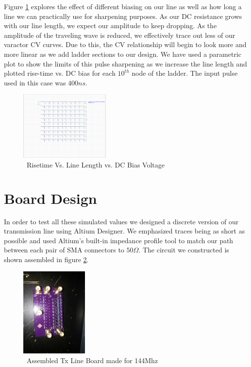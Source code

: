 \documentclass[journal]{IEEEtran} \usepackage[english]{babel}
\begin{document}
 
 Figure \ref{fig:RiseVsLineVsBias} explores the effect of different biasing on
 our line as well as how long a line we can practically use for sharpening
 purposes. As our DC resistance grows with our line length, we expect our
 amplitude to keep dropping. As the amplitude of the traveling wave is reduced,
 we effectively trace out less of our varactor CV curves. Due to this, the CV
 relationship will begin to look more and more linear as we add ladder sections
 to our design. We have used a parametric plot to show the limits of this pulse
 sharpening as we increase  the line length and plotted rise-time vs. DC bias
 for each $10^{th}$ node of the ladder. The input pulse used in this case was
 $400ns$.

\begin{figure}[htb]
\centering
\includegraphics[width=0.4\textwidth,page = {3}]{RiseTimeVsDCBIASVsLength.pdf}
\caption{\ Risetime Vs. Line Length vs. DC Bias Voltage 
}\label{fig:RiseVsLineVsBias}
\end{figure}






\section{Board Design} 


In order to test all these simulated values we designed a discrete version of
our transmission line using Altium Designer. We emphasized traces being as short
as possible and used Altium's built-in impedance profile tool to match our path
between each pair of SMA connectors to $50\Omega$. The circuit we constructed is
shown assembled in figure \ref{fig:assembled}.


\begin{figure}[htb]
\centering
\includegraphics[width=0.3\textwidth, angle = 90]{AssembledBoard.jpg}
\caption{\ Assembled Tx Line Board made for 144Mhz
}\label{fig:assembled}
\end{figure}
\end{document}
